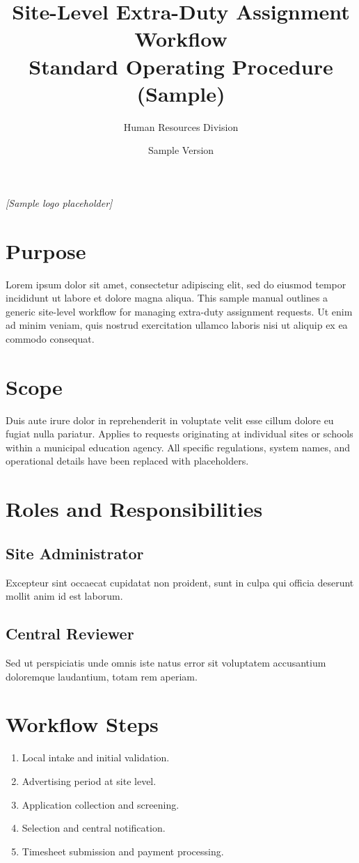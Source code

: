 \documentclass[11pt,a4paper,oneside]{article}
\title{Site-Level Extra-Duty Assignment Workflow\\Standard Operating Procedure (Sample)}
\author{Human Resources Division}
\date{Sample Version}
\begin{document}
\maketitle

\begin{center}
  \vspace{6pt}
  \textit{[Sample logo placeholder]}
\end{center}

\newpage
\tableofcontents
\newpage

\section{Purpose}
Lorem ipsum dolor sit amet, consectetur adipiscing elit, sed do eiusmod tempor incididunt ut labore et dolore magna aliqua. This sample manual outlines a generic site-level workflow for managing extra-duty assignment requests. Ut enim ad minim veniam, quis nostrud exercitation ullamco laboris nisi ut aliquip ex ea commodo consequat.

\section{Scope}
Duis aute irure dolor in reprehenderit in voluptate velit esse cillum dolore eu fugiat nulla pariatur. Applies to requests originating at individual sites or schools within a municipal education agency. All specific regulations, system names, and operational details have been replaced with placeholders.

\section{Roles and Responsibilities}
\subsection{Site Administrator}
Excepteur sint occaecat cupidatat non proident, sunt in culpa qui officia deserunt mollit anim id est laborum.

\subsection{Central Reviewer}
Sed ut perspiciatis unde omnis iste natus error sit voluptatem accusantium doloremque laudantium, totam rem aperiam.

\section{Workflow Steps}
\begin{enumerate}
  \item Local intake and initial validation.
  \item Advertising period at site level.
  \item Application collection and screening.
  \item Selection and central notification.
  \item Timesheet submission and payment processing.
\end{enumerate}
\end{document}
